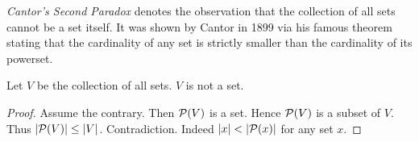 \documentclass{article}
\begin{document}
  \emph{Cantor's Second Paradox} denotes the observation that the collection
  of all sets cannot be a set itself.
  It was shown by Cantor in 1899 via his famous theorem stating that the
  cardinality of any set is strictly smaller than the cardinality of its
  powerset.

  \begin{forthel}
    \begin{theorem*}
      Let $V$ be the collection of all sets.
      $V$ is not a set.
    \end{theorem*}
    \begin{proof}
      Assume the contrary.
      Then $\mathcal{P}(V)$ is a set.
      Hence $\mathcal{P}(V)$ is a subset of $V$.
      Thus $|\mathcal{P}(V)| \leq |V|$.
      Contradiction.
      Indeed $|x| < |\mathcal{P}(x)|$ for any set $x$.
    \end{proof}
  \end{forthel}
\end{document}
